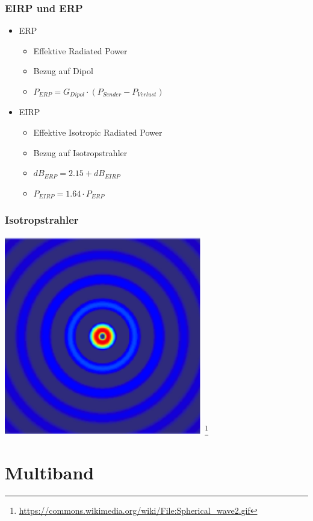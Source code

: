 \begin{frame}
    \frametitle{EIRP und ERP}
    \begin{itemize}
    	\item ERP
		    \begin{itemize}
				\item Effektive Radiated Power
       		 	\item Bezug auf Dipol
       		 	\item $P_{ERP} = G_{Dipol} \cdot (P_{Sender} - P_{Verlust})$
 		   	\end{itemize}
		\item EIRP
		    \begin{itemize}
				\item Effektive Isotropic Radiated Power
       		 	\item Bezug auf Isotropstrahler
       		 	\item $dB_{ERP} = 2.15 + dB_{EIRP}$
       		 	\item $P_{EIRP} = 1.64 \cdot P_{ERP}$
 		   	\end{itemize}
    \end{itemize}
\end{frame}

\begin{frame}
    \frametitle{Isotropstrahler}
    \begin{center}
        \includegraphics[width=0.65\textwidth]{e11/Spherical_wave2.png}
        \footnote{\tiny \url{https://commons.wikimedia.org/wiki/File:Spherical_wave2.gif}}
	\end{center}
\end{frame}

\section*{Multiband}

